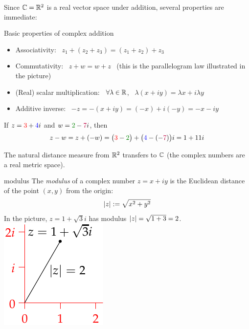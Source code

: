 Since $\mathbb{C}=\mathbb{R}^2$ is a real vector space under addition, several properties are immediate:

\begin{lemm}{Basic properties of complex addition}{}
	\begin{itemize}\itemsep2pt
	  \item[]Associativity: \ $z_1+(z_2+z_3)=(z_1+z_2)+z_3$
	  \item[]Commutativity: \ $z+w=w+z$ \ (this is the parallelogram law illustrated in the picture)
	  \item[](Real) scalar multiplication: \ $\forall \lambda\in\mathbb{R}$, \ $\lambda(x+iy)=\lambda x+i\lambda y$
	  \item[]Additive inverse: \ $-z=-(x+iy)=(-x)+i(-y)=-x-iy$
	\end{itemize}
\end{lemm}

\begin{example}{}{}
	If $z=\textcolor{red}{3}+\textcolor{blue}{4}i$ and $w=\textcolor{Green}{2}-\textcolor{purple}{7}i$, then
	\[
		z-w=z+(-w) = \bigl(\textcolor{red}{3}-\textcolor{Green}{2}\bigr) + \bigl(\textcolor{blue}{4}-(-\textcolor{purple}{7})\bigr)i =1+11i
	\]
\end{example}

\goodbreak


The natural distance measure from $\mathbb{R}^2$ transfers to $\mathbb{C}$ (the complex numbers are a real metric space).

\begin{defn}[lower separated=false, sidebyside, sidebyside align=top seam, sidebyside gap=0pt, righthand width=0.28\linewidth]{}{modulus}
	The \emph{modulus} of a complex number $z=x+iy$ is the Euclidean distance of the point $(x,y)$ from the origin:
	\[
		\left| z\right|:=\sqrt{x^2+y^2}
	\]
	In the picture, $z=1+\sqrt 3 i$ has modulus $\left| z\right|=\sqrt{1+3}=2$.
	\tcblower
	\flushright\includegraphics[scale=0.85]{intro-modulus}
\end{defn}



